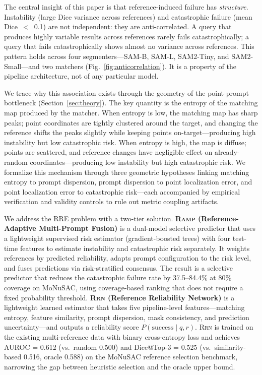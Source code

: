 \documentclass[10pt,twocolumn,letterpaper]{article}
\newcommand{\RAMP}{\textsc{Ramp}}
\newcommand{\RRN}{\textsc{Rrn}}
\begin{document}
The central insight of this paper is that reference-induced failure has
\emph{structure}. Instability (large Dice variance across references) and
catastrophic failure (mean Dice~$<$~0.1) are not independent: they are
anti-correlated. A query that produces highly variable results across
references rarely fails catastrophically; a query that fails catastrophically
shows almost no variance across references. This pattern holds across four
segmenters---SAM-B, SAM-L, SAM2-Tiny, and SAM2-Small---and
two matchers (Fig.~\ref{fig:anticorrelation}). It is a property of the
pipeline architecture, not of any particular model.

We trace why this association exists through the geometry of the
point-prompt bottleneck (Section~\ref{sec:theory}). The key quantity is the
entropy of the matching map produced by the matcher. When entropy is low,
the matching map has sharp peaks; point coordinates are tightly clustered
around the target, and changing the reference shifts the peaks slightly
while keeping points on-target---producing high instability but low
catastrophic risk. When entropy is high, the map is diffuse; points are
scattered, and reference changes have negligible effect on already-random
coordinates---producing low instability but high catastrophic risk. We
formalize this mechanism through three geometric hypotheses linking matching
entropy to prompt dispersion, prompt dispersion to point localization error,
and point localization error to catastrophic risk---each accompanied by
empirical verification and validity controls to rule out metric coupling
artifacts.

We address the RRE problem with a two-tier solution. \textbf{\RAMP{}
(Reference-Adaptive Multi-Prompt Fusion)} is a dual-model selective
predictor that uses a lightweight supervised risk estimator (gradient-boosted
trees) with four test-time features to estimate
instability and catastrophic risk separately. It weights references by
predicted reliability, adapts prompt configuration to the risk level, and
fuses predictions via risk-stratified consensus. The result is a
selective predictor that reduces the catastrophic failure
rate by 37.5--84.4\% at 80\% coverage on MoNuSAC, using coverage-based
ranking that does not require a fixed probability threshold. \textbf{\RRN{} (Reference Reliability Network)} is a lightweight learned estimator
that takes five pipeline-level features---matching entropy, feature
similarity, prompt dispersion, mask consistency, and prediction
uncertainty---and outputs a reliability score $P(\text{success} \mid q, r)$. \RRN{}
is trained on the existing multi-reference data with binary cross-entropy
loss and achieves AUROC = 0.612 (vs.\ random 0.500) and Dice@Top-3 = 0.525
(vs.\ similarity-based 0.516, oracle 0.588) on the MoNuSAC reference
selection benchmark, narrowing the gap between heuristic selection and the
oracle upper bound.
\end{document}
